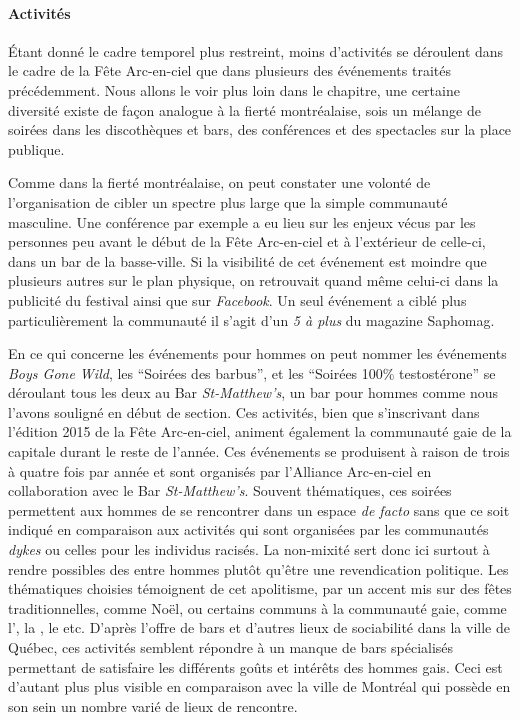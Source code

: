 \paragraph{Activités}
\label{subsec:activitesfetearcenciel}

Étant donné le cadre temporel plus restreint, moins d'activités se déroulent dans le cadre de la Fête Arc-en-ciel que dans plusieurs des événements traités précédemment.
Nous allons le voir plus loin dans le chapitre, une certaine diversité existe de façon analogue à la fierté montréalaise, sois un mélange de soirées dans les discothèques et bars, des conférences et des spectacles sur la place publique.

Comme dans la fierté montréalaise, on peut constater une volonté de l'organisation de cibler un spectre plus large que la simple communauté  masculine.
Une conférence par exemple a eu lieu sur les enjeux vécus par les personnes  peu avant le début de la Fête Arc-en-ciel et à l'extérieur de celle-ci, dans un bar de la basse-ville.
Si la visibilité de cet événement est moindre que plusieurs autres sur le plan physique, on retrouvait quand même celui-ci dans la publicité du festival ainsi que sur \emph{Facebook}.
Un seul événement a ciblé plus particulièrement la communauté  il s'agit d'un \emph{5 à plus} du magazine Saphomag.

En ce qui concerne les événements pour hommes  on peut nommer les événements \emph{Boys Gone Wild}, les \enquote{Soirées des barbus}, et les \enquote{Soirées 100\% testostérone} se déroulant tous les deux au Bar \emph{St-Matthew's}, un bar pour hommes comme nous l'avons souligné en début de section.
Ces activités, bien que s'inscrivant dans l'édition 2015 de la Fête Arc-en-ciel, animent également la communauté gaie de la capitale durant le reste de l'année.
Ces événements se produisent à raison de trois à quatre fois par année et sont organisés par l'Alliance Arc-en-ciel en collaboration avec le Bar \emph{St-Matthew's}.
Souvent thématiques, ces soirées permettent aux hommes de se rencontrer dans un espace \emph{de facto}  sans que ce soit indiqué en comparaison aux activités qui sont organisées par les communautés \emph{dykes} ou celles pour les individus racisés.
La non-mixité sert donc ici surtout à rendre possibles des  entre hommes plutôt qu'être une revendication politique.
Les thématiques choisies témoignent de cet apolitisme, par un accent mis sur des fêtes traditionnelles, comme Noël, ou certains  communs à la communauté gaie, comme l', la , le  etc.
D'après l'offre de bars et d'autres lieux de sociabilité dans la ville de Québec, ces activités semblent répondre à un manque de bars spécialisés permettant de satisfaire les différents goûts et intérêts des hommes gais.
Ceci est d'autant plus plus visible en comparaison avec la ville de Montréal qui possède en son sein un nombre varié de lieux de rencontre.

